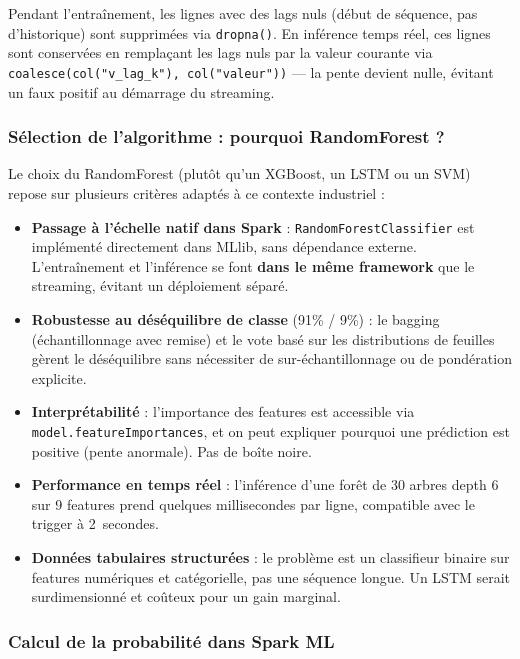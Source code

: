\documentclass[12pt,a4paper]{article}
\begin{document}
Pendant l'entraînement, les lignes avec des lags nuls (début de séquence, pas d'historique) sont supprimées via \texttt{dropna()}. En inférence temps réel, ces lignes sont conservées en remplaçant les lags nuls par la valeur courante via \texttt{coalesce(col("v\_lag\_k"), col("valeur"))} — la pente devient nulle, évitant un faux positif au démarrage du streaming.

\subsubsection{Sélection de l'algorithme : pourquoi RandomForest ?}

Le choix du RandomForest (plutôt qu'un XGBoost, un LSTM ou un SVM) repose sur plusieurs critères adaptés à ce contexte industriel :

\begin{itemize}
    \item \textbf{Passage à l'échelle natif dans Spark} : \texttt{RandomForestClassifier} est implémenté directement dans MLlib, sans dépendance externe. L'entraînement et l'inférence se font \textbf{dans le même framework} que le streaming, évitant un déploiement séparé.
    \item \textbf{Robustesse au déséquilibre de classe} (91\% / 9\%) : le bagging (échantillonnage avec remise) et le vote basé sur les distributions de feuilles gèrent le déséquilibre sans nécessiter de sur-échantillonnage ou de pondération explicite.
    \item \textbf{Interprétabilité} : l'importance des features est accessible via \texttt{model.featureImportances}, et on peut expliquer pourquoi une prédiction est positive (pente anormale). Pas de boîte noire.
    \item \textbf{Performance en temps réel} : l'inférence d'une forêt de 30 arbres depth 6 sur 9 features prend quelques millisecondes par ligne, compatible avec le trigger à 2~secondes.
    \item \textbf{Données tabulaires structurées} : le problème est un classifieur binaire sur features numériques et catégorielle, pas une séquence longue. Un LSTM serait surdimensionné et coûteux pour un gain marginal.
\end{itemize}

\subsubsection{Calcul de la probabilité dans Spark ML}
\end{document}
